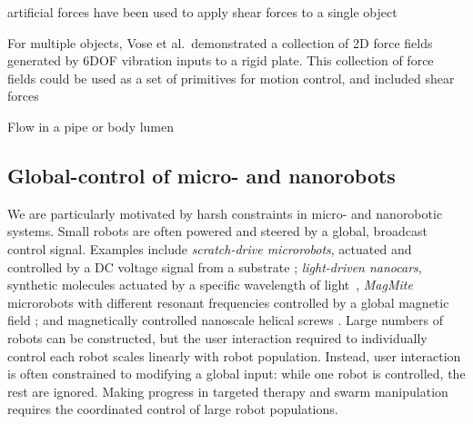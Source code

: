    artificial forces have been used to apply shear forces to a single object \cite{sudsang+2001:for}
   
   For multiple objects, Vose et al.\ demonstrated a collection of 2D force fields generated by 6DOF vibration inputs to a rigid plate\cite{Vose2009a,vose2012sliding}.  This collection of force fields could be used as a set of primitives for motion control, and included shear forces
   
   Flow in a pipe or body lumen







\subsection{Global-control of micro- and nanorobots} %
We are particularly motivated by harsh constraints in micro- and nanorobotic systems.  
Small robots are often powered and steered by a global, broadcast control signal.  Examples include \emph{scratch-drive microrobots}, actuated and controlled by a DC voltage signal from a substrate \cite{Donald2006,Donald2008};  \emph{light-driven nanocars}, synthetic molecules actuated by a specific wavelength of light~\cite{Chiang2011},
 \emph{MagMite} microrobots with different resonant frequencies controlled by a global magnetic field \cite{Frutiger2008}; and  magnetically controlled nanoscale helical screws \cite{Tottori2012,Peyer2013}. Large numbers of robots can be constructed, but the user interaction required to individually control each robot scales linearly with robot population.   
Instead, user interaction is often constrained to modifying a global input: while one robot is controlled, the rest are ignored. Making progress in targeted therapy and swarm manipulation requires the coordinated control of large robot populations.


